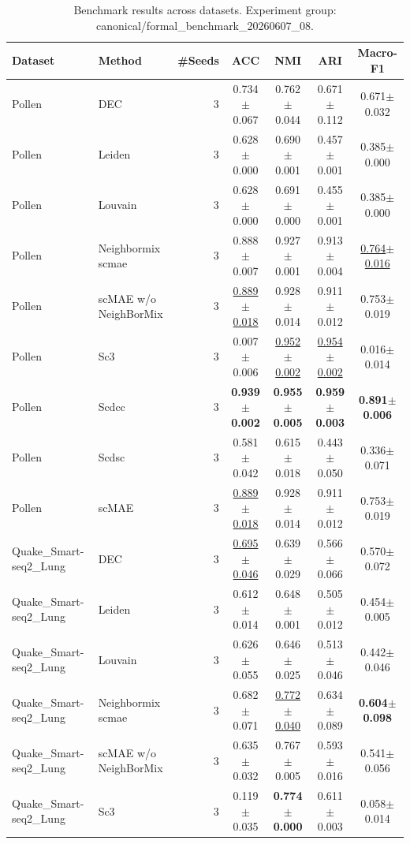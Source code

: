 \begin{table}[t]
\centering
\small
\caption{Benchmark results across datasets. Experiment group: canonical/formal\_benchmark\_20260607\_08.}
\label{tab:benchmark\_main}
\begin{tabular}{llrcccc}
\toprule
Dataset & Method & \#Seeds & ACC & NMI & ARI & Macro-F1 \\
\midrule
Pollen & DEC & 3 & 0.734$\pm$0.067 & 0.762$\pm$0.044 & 0.671$\pm$0.112 & 0.671$\pm$0.032 \\
Pollen & Leiden & 3 & 0.628$\pm$0.000 & 0.690$\pm$0.001 & 0.457$\pm$0.001 & 0.385$\pm$0.000 \\
Pollen & Louvain & 3 & 0.628$\pm$0.000 & 0.691$\pm$0.000 & 0.455$\pm$0.001 & 0.385$\pm$0.000 \\
Pollen & Neighbormix scmae & 3 & 0.888$\pm$0.007 & 0.927$\pm$0.001 & 0.913$\pm$0.004 & \underline{0.764$\pm$0.016} \\
Pollen & scMAE w/o NeighBorMix & 3 & \underline{0.889$\pm$0.018} & 0.928$\pm$0.014 & 0.911$\pm$0.012 & 0.753$\pm$0.019 \\
Pollen & Sc3 & 3 & 0.007$\pm$0.006 & \underline{0.952$\pm$0.002} & \underline{0.954$\pm$0.002} & 0.016$\pm$0.014 \\
Pollen & Scdcc & 3 & \textbf{0.939$\pm$0.002} & \textbf{0.955$\pm$0.005} & \textbf{0.959$\pm$0.003} & \textbf{0.891$\pm$0.006} \\
Pollen & Scdsc & 3 & 0.581$\pm$0.042 & 0.615$\pm$0.018 & 0.443$\pm$0.050 & 0.336$\pm$0.071 \\
Pollen & scMAE & 3 & \underline{0.889$\pm$0.018} & 0.928$\pm$0.014 & 0.911$\pm$0.012 & 0.753$\pm$0.019 \\
\midrule
Quake\_Smart-seq2\_Lung & DEC & 3 & \underline{0.695$\pm$0.046} & 0.639$\pm$0.029 & 0.566$\pm$0.066 & 0.570$\pm$0.072 \\
Quake\_Smart-seq2\_Lung & Leiden & 3 & 0.612$\pm$0.014 & 0.648$\pm$0.001 & 0.505$\pm$0.012 & 0.454$\pm$0.005 \\
Quake\_Smart-seq2\_Lung & Louvain & 3 & 0.626$\pm$0.055 & 0.646$\pm$0.025 & 0.513$\pm$0.046 & 0.442$\pm$0.046 \\
Quake\_Smart-seq2\_Lung & Neighbormix scmae & 3 & 0.682$\pm$0.071 & \underline{0.772$\pm$0.040} & 0.634$\pm$0.089 & \textbf{0.604$\pm$0.098} \\
Quake\_Smart-seq2\_Lung & scMAE w/o NeighBorMix & 3 & 0.635$\pm$0.032 & 0.767$\pm$0.005 & 0.593$\pm$0.016 & 0.541$\pm$0.056 \\
Quake\_Smart-seq2\_Lung & Sc3 & 3 & 0.119$\pm$0.035 & \textbf{0.774$\pm$0.000} & 0.611$\pm$0.003 & 0.058$\pm$0.014 \\

\end{tabular}
\end{table}

